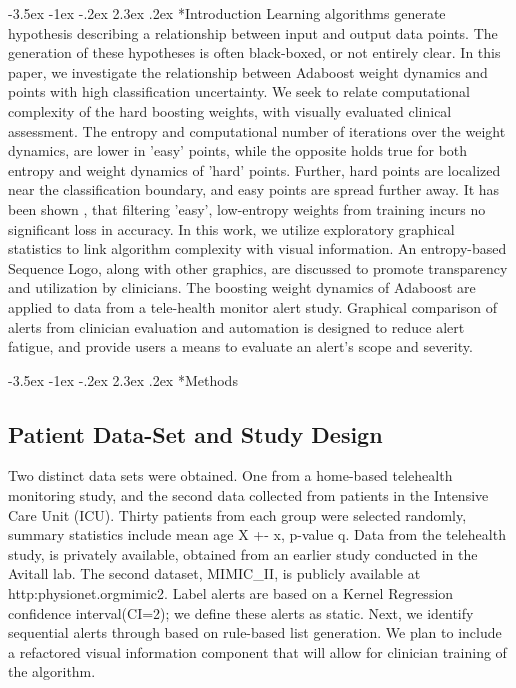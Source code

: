 \documentclass[12pt]{article}
\makeatletter
\renewcommand\section{\@startsection{section}{1}{\z@}%
                                  {-3.5ex \@plus -1ex \@minus -.2ex}%
                                  {2.3ex \@plus.2ex}%
                                  {\normalfont\bfseries}}
\makeatother
\begin{document}
\section*{Introduction}
Learning algorithms generate hypothesis describing a relationship between input and output data points.  The generation of these hypotheses is often black-boxed, or not entirely clear.  In this paper, we investigate the relationship between Adaboost weight dynamics and points with high classification uncertainty.  We seek to relate computational complexity of the hard boosting weights, with visually evaluated clinical assessment.  The entropy and computational number of iterations over the weight dynamics, are lower in 'easy' points, while the opposite holds true for both entropy and weight dynamics of 'hard' points.  Further, hard points are localized near the classification boundary, and easy points are spread further away.  It has been shown \cite{Capri2002}, that filtering 'easy', low-entropy weights from training incurs no significant loss in accuracy.  In this work, we utilize exploratory graphical statistics to link algorithm complexity with visual information.  An entropy-based Sequence Logo, along with other graphics, are discussed to promote transparency and utilization by clinicians.  The boosting weight dynamics of Adaboost are applied to data from a tele-health monitor alert study.  Graphical comparison of alerts from clinician evaluation and automation is designed to reduce alert fatigue, and provide users a means to evaluate an alert's scope and severity.

\section*{Methods}

\subsection{Patient Data-Set and Study Design}
Two distinct data sets were obtained.  One from a home-based telehealth monitoring study, and the second data collected from patients in the Intensive Care Unit (ICU).  Thirty patients from each group were selected randomly, summary statistics include mean age X +- x, p-value q.  Data from the telehealth study, is privately available, obtained from an earlier study conducted in the Avitall lab.  The second dataset, MIMIC\_II, is publicly available at http:\/\/physionet.org\/mimic2\/.  Label alerts are based on a Kernel Regression confidence interval(CI=2); we define these alerts as static.  Next, we identify sequential alerts through based on rule-based list generation\cite{Pieri}.  We plan to include a refactored visual information component that will allow for clinician training of the algorithm.
\end{document}
